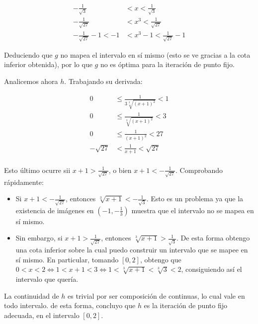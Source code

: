 \documentclass[DIN, pagenumber=false, fontsize=11pt, parskip=half]{scrartcl}
\begin{document}
\begin{enumerate}
\begin{enumerate}
        \begin{align*}
            -\frac{1}{\sqrt{3}} &< x < \frac{1}{\sqrt{3}} \\
            -\frac{1}{\sqrt{27}} &< x^3 < \frac{1}{\sqrt{27}} \\
            -\frac{1}{\sqrt{27}} - 1 < -1 &< x^3 - 1 < \frac{1}{\sqrt{27}} - 1
        \end{align*}

        Deduciendo que $g$ no mapea el intervalo en sí mismo (esto se ve gracias a la cota inferior obtenida), por lo que $g$ no es óptima para la iteración de punto fijo.

        Analicemos ahora $h$. Trabajando su derivada:

        \begin{align*}
            0 &\le \frac{1}{3 \sqrt[3]{{(x+1)}^2}} < 1 \\
            0 &\le \frac{1}{\sqrt[3]{{(x+1)}^2}} < 3 \\
            0 &\le \frac{1}{{(x+1)}^2} < 27 \\
            - \sqrt{27} &< \frac{1}{x+1} < \sqrt{27} \\
        \end{align*}

        Esto último ocurre sii $x+1 > \frac{1}{\sqrt{27}}$, o bien $x + 1 < -\frac{1}{\sqrt{27}}$. Comprobando rápidamente:

        \begin{itemize}
            \item Si $x + 1 < -\frac{1}{\sqrt{27}}$, entonces $\sqrt[3]{x+1} < -\frac{1}{\sqrt{3}}$. Esto es un problema ya que la existencia de imágenes en $(-1,-\frac{1}{3})$
            muestra que el intervalo no se mapea en sí mismo.

            \item Sin embargo, si $x + 1 > \frac{1}{\sqrt{27}}$, entonces $\sqrt[3]{x+1} > \frac{1}{\sqrt{3}}$. De esta forma obtengo una cota inferior sobre la cual puedo construir un intervalo que se mapee en sí mismo.
            En particular, tomando $[0,2]$, obtengo que $0 < x < 2 \iff 1 < x+1 < 3 \iff 1 < \sqrt[3]{x+1} < \sqrt[3]{3} < 2$, consiguiendo así el intervalo que quería.
        \end{itemize}

        La continuidad de $h$ es trivial por ser composición de continuas, lo cual vale en todo intervalo.
        de esta forma, concluyo que $h$ es la iteración de punto fijo adecuada, en el intervalo $[0,2]$.


\end{enumerate}
\end{enumerate}
\end{document}
